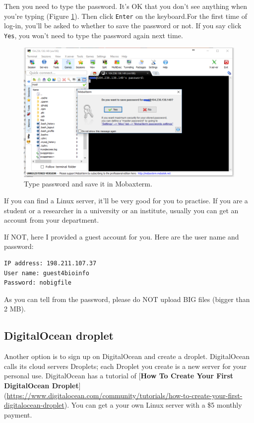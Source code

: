 \documentclass[]{book}
\begin{document}
Then you need to type the password. It's OK that you don't see anything when you're typing (Figure \ref{fig:mobaxtermSavepswd}). Then click \texttt{Enter} on the keyboard.For the first time of log-in, you'll be asked to whether to save the password or not. If you say click \texttt{Yes}, you won't need to type the password again next time.



\begin{figure}
\centering
\includegraphics{figures/mobaxterm_savepassword.png}
\caption{\label{fig:mobaxtermSavepswd}Type password and save it in Mobaxterm.}
\end{figure}

If you can find a Linux server, it'll be very good for you to practise. If you are a student or a researcher in a university or an institute, usually you can get an account from your department.

If NOT, here I provided a guest account for you. Here are the user name and password:

\begin{verbatim}
IP address: 198.211.107.37
User name: guest4bioinfo
Password: nobigfile
\end{verbatim}

As you can tell from the password, please do NOT upload BIG files (bigger than 2 MB).

\hypertarget{digitalocean-droplet}{%
\subsection{DigitalOcean droplet}\label{digitalocean-droplet}}

Another option is to sign up on DigitalOcean and create a droplet. DigitalOcean calls its cloud servers Droplets; each Droplet you create is a new server for your personal use. DigitalOcean has a tutorial of {[}\textbf{How To Create Your First DigitalOcean Droplet}{]} (\url{https://www.digitalocean.com/community/tutorials/how-to-create-your-first-digitalocean-droplet}). You can get a your own Linux server with a \$5 monthly payment.
\end{document}
